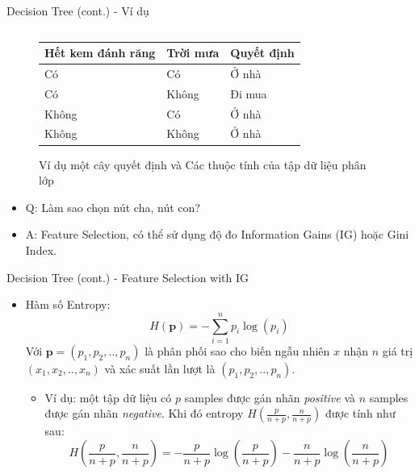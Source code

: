 \documentclass[aspectratio=169,xcolor=dvipsnames]{beamer}
\begin{document}
\begin{frame}{Decision Tree (cont.) - Ví dụ}
\begin{figure}[H]
\begin{columns}[c]
\begin{table}
\begin{tabular}{|l|l|l|}
	\hline
	Hết kem đánh răng & Trời mưa & Quyết định \\
	\hline
	Có & Có & Ở nhà \\
	Có & Không & Đi mua \\
	Không & Có & Ở nhà \\
	Không & Không & Ở nhà \\
	\hline
\end{tabular}
\end{table}
\end{columns}
\caption{Ví dụ một cây quyết định và Các thuộc tính của tập dữ liệu phân lớp}
\end{figure}

\begin{itemize}
	\item Q: Làm sao chọn nút cha, nút con?
	\item A: Feature Selection, có thể sử dụng độ đo Information Gains (IG) hoặc Gini Index.
\end{itemize}
\end{frame}

\begin{frame}{Decision Tree (cont.) - Feature Selection with IG}
\begin{itemize}
\item Hàm số Entropy:
$$
H(\textbf{p}) = -\sum_{i = 1}^n p_i\log(p_i)
$$
Với $\textbf{p} = (p_1, p_2, .., p_n)$ là phân phối sao cho biến ngẫu nhiên $x$ nhận $n$ giá trị $(x_1, x_2, .., x_n)$ và xác suất lần lượt là $(p_1, p_2, .., p_n)$.

\begin{itemize}
\item Ví dụ: một tập dữ liệu có $p$ samples được gán nhãn \textit{positive} và $n$ samples được gán nhãn \textit{negative}. Khi đó entropy $H(\frac{p}{n + p}, \frac{n}{n + p})$ được tính như sau:
$$
H\left(\frac{p}{n + p}, \frac{n}{n + p}\right) = - \frac{p}{n + p}\log\left(\frac{p}{n + p}\right) - \frac{n}{n + p}\log\left(\frac{n}{n + p}\right)
$$
\end{itemize}
\end{itemize}
\end{frame}
\end{document}
